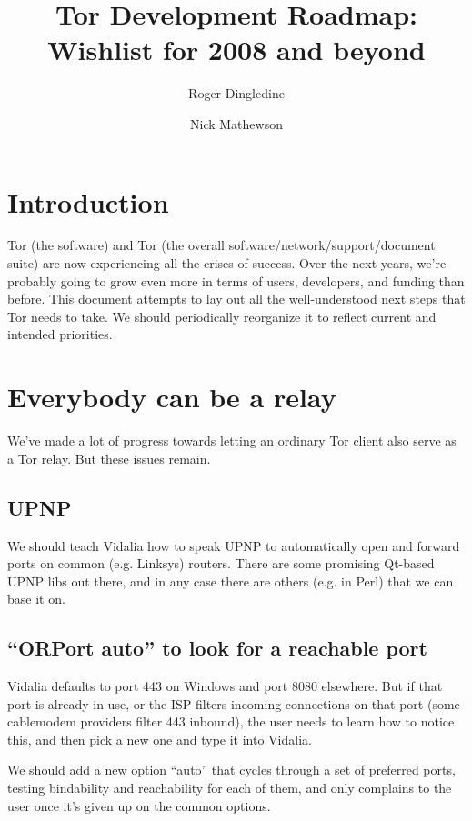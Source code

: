 \documentclass{article}
\begin{document}
\title{Tor Development Roadmap: Wishlist for 2008 and beyond}
\author{Roger Dingledine \and Nick Mathewson}

\maketitle
\pagestyle{plain}

\section{Introduction}

Tor (the software) and Tor (the overall software/network/support/document
suite) are now experiencing all the crises of success.  Over the next
years, we're probably going to grow even more in terms of users, developers,
and funding than before. This document attempts to lay out all the
well-understood next steps that Tor needs to take. We should periodically
reorganize it to reflect current and intended priorities.

\section{Everybody can be a relay}

We've made a lot of progress towards letting an ordinary Tor client also
serve as a Tor relay. But these issues remain.

\subsection{UPNP}

We should teach Vidalia how to speak UPNP to automatically open and
forward ports on common (e.g. Linksys) routers. There are some promising
Qt-based UPNP libs out there, and in any case there are others (e.g. in
Perl) that we can base it on.

\subsection{``ORPort auto'' to look for a reachable port}

Vidalia defaults to port 443 on Windows and port 8080 elsewhere. But if
that port is already in use, or the ISP filters incoming connections
on that port (some cablemodem providers filter 443 inbound), the user
needs to learn how to notice this, and then pick a new one and type it
into Vidalia.

We should add a new option ``auto'' that cycles through a set of preferred
ports, testing bindability and reachability for each of them, and only
complains to the user once it's given up on the common options.
\end{document}
